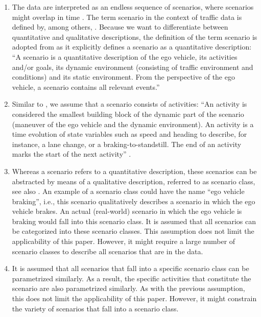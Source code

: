 \begin{enumerate}
	\item The data are interpreted as an endless sequence of scenarios, where scenarios might overlap in time \cite{elrofai2018scenario}. The term scenario in the context of traffic data is defined by, among others, \textcite{geyer2014, ulbrich2015, elrofai2016scenario, elrofai2018scenario}. Because we want to differentiate between quantitative and qualitative descriptions, the definition of the term scenario is adopted from \textcite{elrofai2018scenario} as it explicitly defines a scenario as a quantitative description: ``A scenario is a quantitative description of the ego vehicle, its activities and/or goals, its dynamic environment (consisting of traffic environment and conditions) and its static environment. From the perspective of the ego vehicle, a scenario contains all relevant events.''
	
	\item Similar to \textcite{elrofai2018scenario}, we assume that a scenario consists of activities: ``An activity is considered the smallest building block of the dynamic part of the scenario (maneuver of the ego vehicle and the dynamic environment). An activity is a time evolution of state variables such as speed and heading to describe, for instance, a lane change, or a braking-to-standstill. The end of an activity marks the start of the next activity'' \cite{elrofai2018scenario}.
	
	\item Whereas a scenario refers to a quantitative description, these scenarios can be abstracted by means of a qualitative description, referred to as scenario class, see also \textcite{ploeg2018cetran, elrofai2018scenario}. An example of a scenario class could have the name ``ego vehicle braking'', i.e., this scenario qualitatively describes a scenario in which the ego vehicle brakes. An actual (real-world) scenario in which the ego vehicle is braking would fall into this scenario class. It is assumed that all scenarios can be categorized into these scenario classes. This assumption does not limit the applicability of this paper. However, it might require a large number of scenario classes to describe all scenarios that are in the data.
	
	\item It is assumed that all scenarios that fall into a specific scenario class can be parametrized similarly. As a result, the specific activities that constitute the scenario are also parametrized similarly. As with the previous assumption, this does not limit the applicability of this paper. However, it might constrain the variety of scenarios that fall into a scenario class. 
\end{enumerate}


